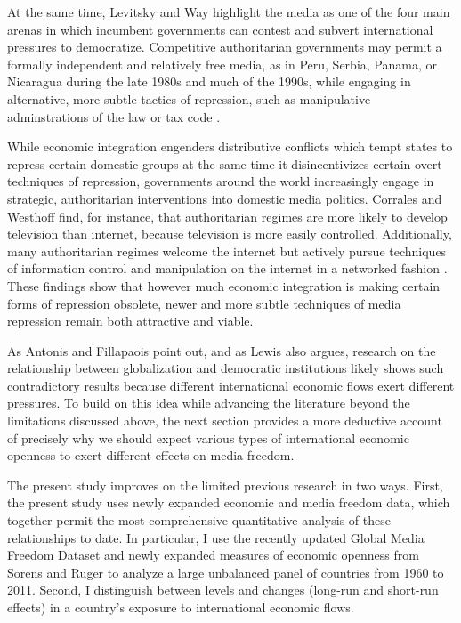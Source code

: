 \documentclass[12pt,a4paper]{article}\usepackage[]{graphicx}\usepackage[]{color}
\begin{document}
At the same time, Levitsky and Way highlight the media as one of the four main arenas in which incumbent governments can contest and subvert international pressures to democratize. Competitive authoritarian governments may permit a formally independent and relatively free media, as in Peru, Serbia, Panama, or Nicaragua during the late 1980s and much of the 1990s, while engaging in alternative, more subtle tactics of repression, such as manipulative adminstrations of the law or tax code \parencite[53, 58]{Levitsky:2002gx}.

While economic integration engenders distributive conflicts which tempt states to repress certain domestic groups at the same time it disincentivizes certain overt techniques of repression, governments around the world increasingly engage in strategic, authoritarian interventions into domestic media politics. Corrales and Westhoff \parencite*{Corrales:2006vz} find, for instance, that authoritarian regimes are more likely to develop television than internet, because television is more easily controlled. Additionally, many authoritarian regimes welcome the internet but actively pursue techniques of information control and manipulation on the internet in a networked fashion \parencites{MacKinnon:2011id}{Pearce:2012fm}. These findings show that however much economic integration is making certain forms of repression obsolete, newer and more subtle techniques of media repression remain both attractive and viable.

As Antonis and Fillapaois point out, and as Lewis also argues, research on the relationship between globalization and democratic institutions likely shows such contradictory results because different international economic flows exert different pressures. To build on this idea while advancing the literature beyond the limitations discussed above, the next section provides a more deductive account of precisely why we should expect various types of international economic openness to exert different effects on media freedom.

The present study improves on the limited previous research in two ways. First, the present study uses newly expanded economic and media freedom data, which together permit the most comprehensive quantitative analysis of these relationships to date. In particular, I use the recently updated Global Media Freedom Dataset \parencites*{Belle:1997wo}{van2000press} and newly expanded measures of economic openness from Sorens and Ruger \parencite*{Sorens:wc} to analyze a large unbalanced panel of countries from 1960 to 2011. Second, I distinguish between levels and changes (long-run and short-run effects) in a country's exposure to international economic flows.
\end{document}
